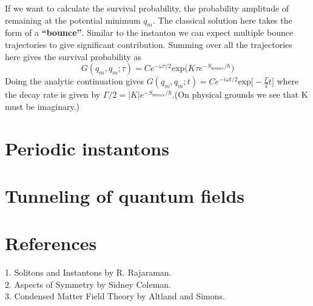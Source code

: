 \documentclass[a4paper, 12pt]{article}
\begin{document}
If we want to calculate the survival probability, the probability amplitude of remaining at the potential minimum $q_m$. The classical solution here takes the form of a \textbf{``bounce''}. Similar to the instanton we can expect multiple bounce trajectories to give significant contribution. Summing over all the trajectories here gives the survival probability as
\begin{equation}
G(q_m,q_m;\tau) = Ce^{-\omega\tau /2} \mathrm{exp}\Big(K \tau e^{-S_{bounce}/\hbar}\Big)
\end{equation}
Doing the analytic continuation gives $G(q_m,q_m;t) = Ce^{-i\omega t /2} \mathrm{exp}\big[-\frac{\Gamma}{2}t\big]$ where the decay rate is given by $\Gamma /2 = |K| e^{-S_{bounce}/\hbar}$.(On physical grounds we see that K must be imaginary.)
\section {Periodic instantons}

\section {Tunneling of quantum fields}


  \section {References}
1. Solitons and Instantons by R. Rajaraman.\\
2. Aspects of Symmetry by Sidney Coleman.\\
3. Condensed Matter Field Theory by Altland and Simons.
\end{document}
